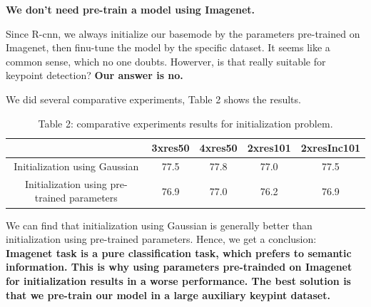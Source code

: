 \textbf{We don't need pre-train a model using Imagenet.}

Since R-cnn\cite{girshick2014rich}, we always initialize our basemode by the parameters pre-trained on Imagenet, then finu-tune the model by the specific dataset.
It seems like a common sense, which no one doubts.
Howerver, is that really suitable for keypoint detection?
\textbf{Our answer is no.}

We did several comparative experiments, Table 2 shows the results.

\captionsetup[table]{labelformat=empty}
\begin{table}[!hbp]
  \centering
  \begin{tabular}{|c|c|c|c|c|}
  \hline
            & 3xres50 & 4xres50 & 2xres101 & 2xresInc101  \\
  \hline
  Initialization using Gaussian & 77.5 & 77.8 & 77.0 & 77.5 \\
  \hline
  Initialization using pre-trained parameters & 76.9 & 77.0 & 76.2 & 76.9 \\
  \hline
  \end{tabular}
  \caption{Table 2: comparative experiments results for initialization problem.}
\end{table}

We can find that initialization using Gaussian is generally better than initialization using pre-trained parameters.
Hence, we get a conclusion: \textbf{Imagenet task is a pure classification task, which prefers to semantic information.
This is why using parameters pre-trainded on Imagenet for initialization results in a worse performance.
The best solution is that we pre-train our model in a large auxiliary keypint dataset.}





